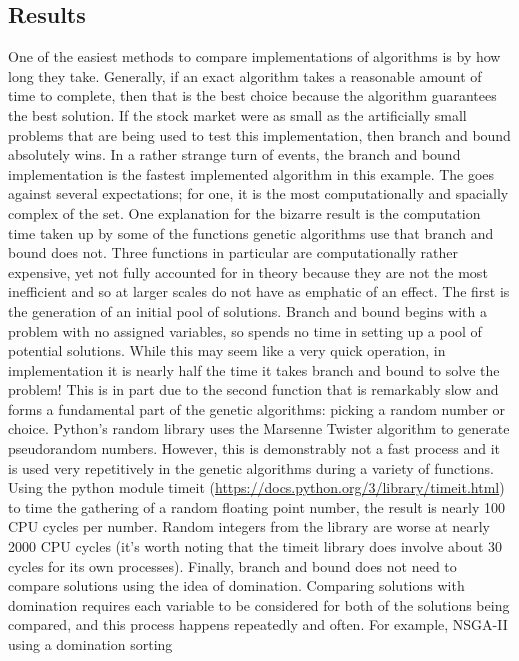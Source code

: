 \documentclass{article}
\begin{document}
    \subsection{Results}
    One of the easiest methods to compare implementations of algorithms is by how long they take. Generally, if an exact algorithm takes a reasonable amount of 
    time to complete, then that is the best choice because the algorithm guarantees the best solution. If the stock market were as small as the artificially small
    problems that are being used to test this implementation, then branch and bound absolutely wins. In a rather strange turn of events, the branch and bound 
    implementation is the fastest implemented algorithm in this example. The goes against several expectations; for one, it is the most computationally and spacially
    complex of the set. One explanation for the bizarre result is the computation time taken up by some of the functions genetic algorithms use that branch and bound
    does not. Three functions in particular are computationally rather expensive, yet not fully accounted for in theory because they are not the most inefficient 
    and so at larger scales do not have as emphatic of an effect. The first is the generation of an initial pool of solutions. Branch and bound begins with a problem 
    with no assigned variables, so spends no time in setting up a pool of potential solutions. While this may seem like a very quick operation, in implementation it is 
    nearly half the time it takes branch and bound to solve the problem! This is in part due to the second function that is remarkably slow and forms a fundamental
    part of the genetic algorithms: picking a random number or choice. Python's random library uses the Marsenne Twister algorithm to generate pseudorandom numbers. 
    However, this is demonstrably not a fast process and it is used very repetitively in the genetic algorithms during a variety of functions. Using the python module
    timeit (\url{https://docs.python.org/3/library/timeit.html}) to time the gathering of a random floating point number, the result is nearly 100 CPU cycles per number. 
    Random integers from the library are worse at nearly 2000 CPU cycles (it's worth noting that the timeit library does involve about 30 cycles for its own processes).
    Finally, branch and bound does not need to compare solutions using the idea of domination. Comparing solutions with domination requires
    each variable to be considered for both of the solutions being compared, and this process happens repeatedly and often. For example, NSGA-II using a domination sorting 
\end{document}
